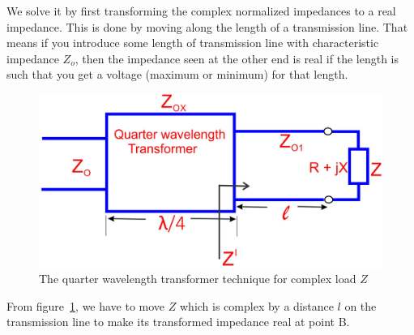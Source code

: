 We solve it by first transforming the complex normalized impedances to a real impedance. This is done by moving along the length of a transmission line. That means if you introduce some length of transmission line with characteristic impedance $ Z_o$, then the impedance seen at the other end is real if the length is such that you get a voltage (maximum or minimum) for that length.
\begin{figure}[h]
\centering
\includegraphics[width=1\linewidth]{./graphics/fig10}
\caption{The quarter wavelength transformer technique for complex load $Z$}
\label{fig:fig10}
\end{figure}

From figure~\ref{fig:fig10}, we have to move $Z$ which is complex by a distance $l$ on the transmission line to make its transformed impedance real at point B.

